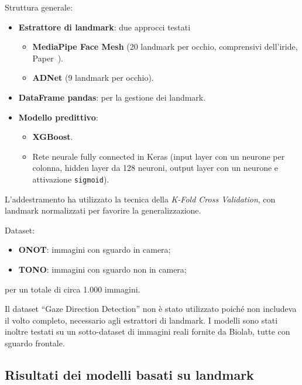 \documentclass[12pt,a4paper,openright,twoside]{book}
\begin{document}
Struttura generale:
\begin{itemize}
    \item \textbf{Estrattore di landmark}: due approcci testati
    \begin{itemize}
        \item \textbf{MediaPipe Face Mesh} (20 landmark per occhio, comprensivi dell'iride, Paper~\cite{48292}).
        \item \textbf{ADNet} (9 landmark per occhio).
    \end{itemize}
    \item \textbf{DataFrame pandas}: per la gestione dei landmark.
    \item \textbf{Modello predittivo}: 
    \begin{itemize}
        \item \textbf{XGBoost}.
        \item Rete neurale fully connected in Keras (input layer con un neurone per colonna, hidden layer da 128 neuroni, output layer con un neurone e attivazione \texttt{sigmoid}).
    \end{itemize}
\end{itemize}

L'addestramento ha utilizzato la tecnica della \textit{K-Fold Cross Validation}, con landmark normalizzati per favorire la generalizzazione.  

Dataset:
\begin{itemize}
    \item \textbf{ONOT}: immagini con sguardo in camera;
    \item \textbf{TONO}: immagini con sguardo non in camera;
\end{itemize}
per un totale di circa 1.000 immagini.  

Il dataset ``Gaze Direction Detection'' non è stato utilizzato poiché non includeva il volto completo, necessario agli estrattori di landmark. I modelli sono stati inoltre testati su un sotto-dataset di immagini reali fornite da Biolab, tutte con sguardo frontale.

\subsection{Risultati dei modelli basati su landmark}
\end{document}
